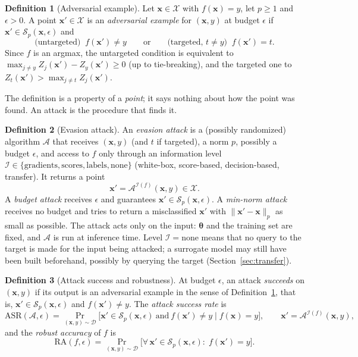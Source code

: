 \documentclass[10pt,a4paper]{extarticle}
\theoremstyle{definition}
\newtheorem{definition}{Definition}[section]
\newcommand{\X}{\mathcal{X}}
\newcommand{\D}{\mathcal{D}}
\newcommand{\x}{\mathbf{x}}
\newcommand{\xadv}{\mathbf{x}'}
\newcommand{\btheta}{\boldsymbol{\theta}}
\begin{document}
\begin{definition}[Adversarial example]\label{def:adv}
Let \(\x\in\X\) with \(f(\x)=y\), let \(p\ge1\) and \(\epsilon>0\). A point \(\xadv\in\X\) is an \emph{adversarial example} for \((\x,y)\) at budget \(\epsilon\) if \(\xadv\in\mathcal{S}_p(\x,\epsilon)\) and
\[
\text{(untargeted)}\;\; f(\xadv)\neq y
\qquad\text{or}\qquad
\text{(targeted, } t\neq y\text{)}\;\; f(\xadv)=t .
\]
Since \(f\) is an argmax, the untargeted condition is equivalent to \(\max_{j\neq y}Z_j(\xadv)-Z_y(\xadv)\ge 0\) (up to tie-breaking), and the targeted one to \(Z_t(\xadv)>\max_{j\neq t}Z_j(\xadv)\).
\end{definition}

The definition is a property of a \emph{point}; it says nothing about how the point was found. An attack is the procedure that finds it.

\begin{definition}[Evasion attack]\label{def:attack}
An \emph{evasion attack} is a (possibly randomized) algorithm \(\mathcal{A}\) that receives \((\x,y)\) (and \(t\) if targeted), a norm \(p\), possibly a budget \(\epsilon\), and access to \(f\) only through an information level \(\mathcal{I}\in\{\text{gradients},\text{scores},\text{labels},\text{none}\}\) (white-box, score-based, decision-based, transfer). It returns a point
\[
\xadv=\mathcal{A}^{\mathcal{I}(f)}(\x,y)\in\X .
\]
A \emph{budget attack} receives \(\epsilon\) and guarantees \(\xadv\in\mathcal{S}_p(\x,\epsilon)\). A \emph{min-norm attack} receives no budget and tries to return a misclassified \(\xadv\) with \(\|\xadv-\x\|_p\) as small as possible. The attack acts only on the input: \(\btheta\) and the training set are fixed, and \(\mathcal{A}\) is run at inference time. Level \(\mathcal{I}=\text{none}\) means that no query to the target is made for the input being attacked; a surrogate model may still have been built beforehand, possibly by querying the target (Section~\ref{sec:transfer}).
\end{definition}

\begin{definition}[Attack success and robustness]\label{def:robust}
At budget \(\epsilon\), an attack \emph{succeeds} on \((\x,y)\) if its output is an adversarial example in the sense of Definition~\ref{def:adv}, that is, \(\xadv\in\mathcal{S}_p(\x,\epsilon)\) and \(f(\xadv)\neq y\). The \emph{attack success rate} is
\[
\mathrm{ASR}(\mathcal{A},\epsilon)=\Pr_{(\x,y)\sim\D}\Big[\xadv\in\mathcal{S}_p(\x,\epsilon)\ \text{and}\ f(\xadv)\neq y \;\Big|\; f(\x)=y\Big],\qquad \xadv=\mathcal{A}^{\mathcal{I}(f)}(\x,y),
\]
and the \emph{robust accuracy} of \(f\) is
\[
\mathrm{RA}(f,\epsilon)=\Pr_{(\x,y)\sim\D}\Big[\forall\,\xadv\in\mathcal{S}_p(\x,\epsilon):\; f(\xadv)=y\Big].
\]
\end{definition}
\end{document}
